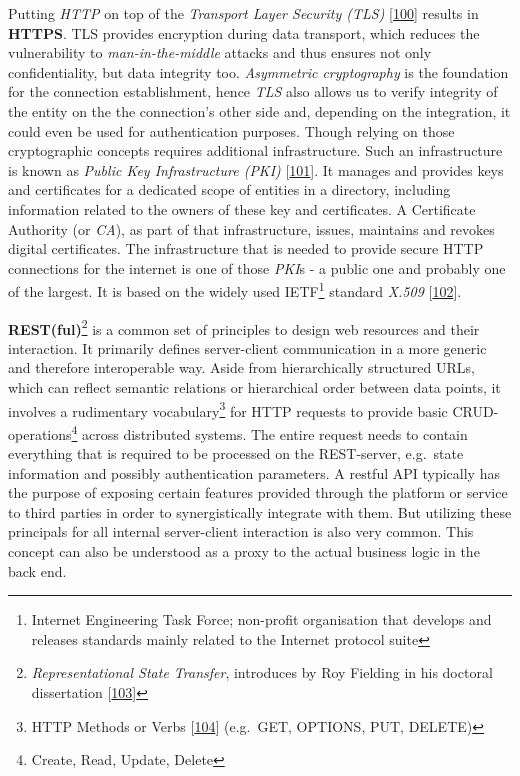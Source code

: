 \documentclass[12pt,english,a4paper,titlepage,cleardoublepage=empty,dottedtoc]{report}
\begin{document}
Putting \emph{HTTP} on top of the \emph{Transport Layer Security (TLS)}
{[}\protect\hyperlink{ref-web_spec_tls}{100}{]} results in
\textbf{\protect\hypertarget{def--https}{}{HTTPS}}. TLS provides
encryption during data transport, which reduces the vulnerability to
\emph{man-in-the-middle} attacks and thus ensures not only
confidentiality, but data integrity too. \emph{Asymmetric cryptography}
is the foundation for the connection establishment, hence \emph{TLS}
also allows us to verify integrity of the entity on the the connection's
other side and, depending on the integration, it could even be used for
authentication purposes. Though relying on those cryptographic concepts
requires additional infrastructure. Such an infrastructure is known as
\emph{Public Key Infrastructure (PKI)}
{[}\protect\hyperlink{ref-book_2014_chapter-14-5-pki}{101}{]}. It
manages and provides keys and certificates for a dedicated scope of
entities in a directory, including information related to the owners of
these key and certificates. A Certificate Authority (or \emph{CA}), as
part of that infrastructure, issues, maintains and revokes digital
certificates. The infrastructure that is needed to provide secure HTTP
connections for the internet is one of those \emph{PKI}s - a public one
and probably one of the largest. It is based on the widely used
IETF\footnote{Internet Engineering Task Force; non-profit organisation
  that develops and releases standards mainly related to the Internet
  protocol suite} standard \emph{X.509}
{[}\protect\hyperlink{ref-web_spec_x509}{102}{]}.

\textbf{REST(ful)}\footnote{\emph{Representational State Transfer},
  introduces by Roy Fielding in his doctoral dissertation
  {[}\protect\hyperlink{ref-web_spec_rest}{103}{]}} is a common set of
principles to design web resources and their interaction. It primarily
defines server-client communication in a more generic and therefore
interoperable way. Aside from hierarchically structured URLs, which can
reflect semantic relations or hierarchical order between data points, it
involves a rudimentary vocabulary\footnote{HTTP Methods or Verbs
  {[}\protect\hyperlink{ref-web_spec_http-methods}{104}{]} (e.g.~GET,
  OPTIONS, PUT, DELETE)} for HTTP requests to provide basic
CRUD-operations\footnote{Create, Read, Update, Delete} across
distributed systems. The entire request needs to contain everything that
is required to be processed on the REST-server, e.g.~state information
and possibly authentication parameters. A restful API typically has the
purpose of exposing certain features provided through the platform or
service to third parties in order to synergistically integrate with
them. But utilizing these principals for all internal server-client
interaction is also very common. This concept can also be understood as
a proxy to the actual business logic in the back end.
\end{document}
